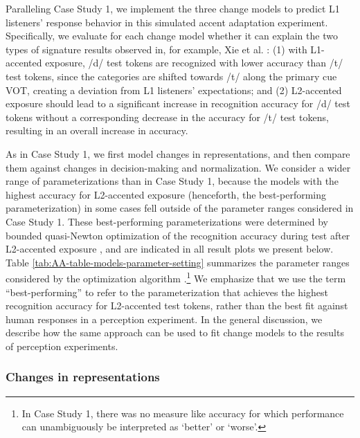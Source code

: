 \documentclass[
  11pt,
  man,floatsintext]{apa6}
\begin{document}
Paralleling Case Study 1, we implement the three change models to predict L1 listeners' response behavior in this simulated accent adaptation experiment. Specifically, we evaluate for each change model whether it can explain the two types of signature results observed in, for example, Xie et al. \autocite*{xie2016jep}: (1) with L1-accented exposure, /d/ test tokens are recognized with lower accuracy than /t/ test tokens, since the categories are shifted towards /t/ along the primary cue VOT, creating a deviation from L1 listeners' expectations; and (2) L2-accented exposure should lead to a significant increase in recognition accuracy for /d/ test tokens without a corresponding decrease in the accuracy for /t/ test tokens, resulting in an overall increase in accuracy.

As in Case Study 1, we first model changes in representations, and then compare them against changes in decision-making and normalization. We consider a wider range of parameterizations than in Case Study 1, because the models with the highest accuracy for L2-accented exposure (henceforth, the best-performing parameterization) in some cases fell outside of the parameter ranges considered in Case Study 1. These best-performing parameterizations were determined by bounded quasi-Newton optimization of the recognition accuracy during test after L2-accented exposure \autocite[implemented in function \texttt{optim()} in R]{byrd1995}, and are indicated in all result plots we present below. Table \ref{tab:AA-table-models-parameter-setting} summarizes the parameter ranges considered by the optimization algorithm \autocite[\(\nu_{c,0}\) must be larger than the number of cues \(k\) + 1,][p.~134]{murphy2012}.\footnote{In Case Study 1, there was no measure like accuracy for which performance can unambiguously be interpreted as `better' or `worse'.} We emphasize that we use the term ``best-performing'' to refer to the parameterization that achieves the highest recognition accuracy for L2-accented test tokens, rather than the best fit against human responses in a perception experiment. In the general discussion, we describe how the same approach can be used to fit change models to the results of perception experiments.

\hypertarget{changes-in-representations-1}{%
\subsubsection{Changes in representations}\label{changes-in-representations-1}}
\end{document}

